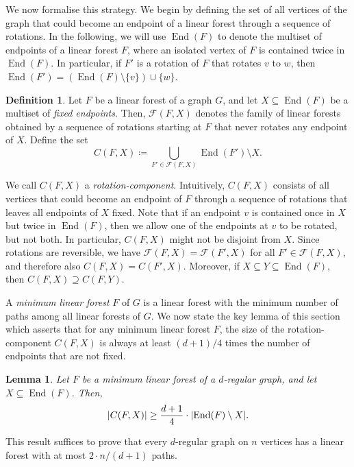 \documentclass[11pt]{article}
\theoremstyle{plain}
\newtheorem{lemma}[theorem]{Lemma}
\theoremstyle{definition}
\newtheorem{definition}[theorem]{Definition}
\newcommand{\cF}{\mathcal F}
\DeclarePairedDelimiter{\abs}{\lvert}{\rvert}
\DeclareMathOperator{\End}{End}
\begin{document}
We now formalise this strategy. We begin by defining the set of all vertices of the graph that could become an endpoint of a linear forest through a sequence of rotations. In the following, we will use $\End(F)$ to denote the multiset of endpoints of a linear forest $F$, where an isolated vertex of $F$ is contained twice in $\End(F)$. In particular, if $F'$ is a rotation of $F$ that rotates $v$ to $w$, then $\End(F') = (\End(F) \setminus \{v\}) \cup \{w\}$.

\begin{definition}
    Let $F$ be a linear forest of a graph $G$, and let $X \subseteq \End(F)$ be a multiset of \emph{fixed endpoints}. Then, $\cF(F,X)$ denotes the family of linear forests obtained by a sequence of rotations starting at $F$ that never rotates any endpoint of $X$. Define the set
    \[
        C(F,X) \coloneqq \bigcup_{F' \in \cF(F,X)} \End(F') \setminus X.
    \]
\end{definition}

We call $C(F,X)$ a \emph{rotation-component}. Intuitively, $C(F,X)$ consists of all vertices that could become an endpoint of $F$ through a sequence of rotations that leaves all endpoints of $X$ fixed. Note that if an endpoint $v$ is contained once in $X$ but twice in $\End(F)$, then we allow one of the endpoints at $v$ to be rotated, but not both. In particular, $C(F,X)$ might not be disjoint from $X$. Since rotations are reversible, we have $\cF(F,X) = \cF(F',X)$ for all $F' \in \cF(F,X)$, and therefore also $C(F,X) = C(F',X)$. Moreover, if $X \subseteq Y \subseteq \End(F)$, then $C(F,X) \supseteq C(F,Y)$.

A \emph{minimum linear forest} $F$ of $G$ is a linear forest with the minimum number of paths among all linear forests of $G$. We now state the key lemma of this section which asserts that for any minimum linear forest $F$, the size of the rotation-component $C(F,X)$ is always at least $(d+1)/4$ times the number of endpoints that are not fixed.

\begin{lemma}\label{prop:componentsize}
    Let $F$ be a minimum linear forest of a $d$-regular graph, and let $X \subseteq \End(F)$. Then,
    \[
        \abs{C(F,X)} \ge \frac{d+1}{4} \cdot \abs{\End(F) \setminus X}.
    \]
\end{lemma}

This result suffices to prove that every $d$-regular graph on $n$ vertices has a linear forest with at most $2 \cdot n / (d+1)$ paths.
\end{document}
